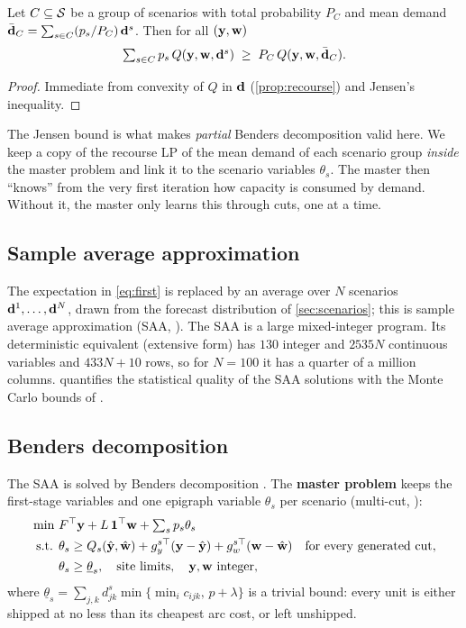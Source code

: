 \begin{proposition}\label{prop:jensen}
Let $C\subseteq\mathcal{S}$ be a group of scenarios with total probability $P_C$ and mean demand $\bar{\mathbf{d}}_C=\sum_{s\in C}(p_s/P_C)\,\mathbf{d}^s$. Then for all $(\mathbf{y},\mathbf{w})$
\[ \textstyle\sum_{s\in C} p_s\, Q(\mathbf{y},\mathbf{w},\mathbf{d}^s) \;\ge\; P_C\, Q(\mathbf{y},\mathbf{w},\bar{\mathbf{d}}_C). \]
\end{proposition}
\begin{proof} Immediate from convexity of $Q$ in $\mathbf{d}$ (\cref{prop:recourse}) and Jensen's inequality. \end{proof}

The Jensen bound is what makes \emph{partial} Benders decomposition \citep{crainic2021} valid here.
We keep a copy of the recourse LP of the mean demand of each scenario group \emph{inside} the master problem and link it to the scenario variables $\theta_s$.
The master then ``knows'' from the very first iteration how capacity is consumed by demand.
Without it, the master only learns this through cuts, one at a time.

\subsection{Sample average approximation}
The expectation in \eqref{eq:first} is replaced by an average over $N$ scenarios $\mathbf{d}^1,\dots,\mathbf{d}^N$, drawn from the forecast distribution of \cref{sec:scenarios}; this is sample average approximation (SAA, \citep{kleywegt2002,shapiro2009}).
The SAA is a large mixed-integer program.
Its deterministic equivalent (extensive form) has $130$ integer and $2535N$ continuous variables and $433N+10$ rows, so for $N=100$ it has a quarter of a million columns.
 quantifies the statistical quality of the SAA solutions with the Monte Carlo bounds of \citet{mak1999}.

\subsection{Benders decomposition}\label{sec:benders}
The SAA is solved by Benders decomposition \citep{benders1962,vanslyke1969}.
The \textbf{master problem} keeps the first-stage variables and one epigraph variable $\theta_s$ per scenario (multi-cut, \citep{birge1988}):
\begin{equation}\label{eq:master}
\begin{aligned}
 \min\ & F^\top\mathbf{y} + L\,\mathbf{1}^\top\mathbf{w} + \textstyle\sum_s p_s\theta_s\\
 \text{s.t. }& \theta_s \ge Q_s(\hat{\mathbf{y}},\hat{\mathbf{w}}) + g^{s\top}_{y}(\mathbf{y}-\hat{\mathbf{y}}) + g^{s\top}_{w}(\mathbf{w}-\hat{\mathbf{w}}) \quad \text{for every generated cut},\\
 & \theta_s \ge \underline{\theta}_s,\quad \text{site limits},\quad \mathbf{y},\mathbf{w} \text{ integer},
\end{aligned}
\end{equation}
where $\underline\theta_s=\sum_{j,k}d^s_{jk}\min\{\min_i c_{ijk},\,p+\lambda\}$ is a trivial bound: every unit is either shipped at no less than its cheapest arc cost, or left unshipped.

